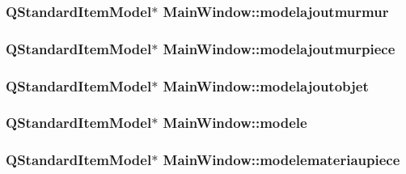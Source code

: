 \hypertarget{class_main_window_acd367909c8521374eb653c45461cc156}{
\subsubsection[{modelajoutmurmur}]{\setlength{\rightskip}{0pt plus 5cm}Q\+Standard\+Item\+Model$\ast$ Main\+Window\+::modelajoutmurmur\hspace{0.3cm}{\ttfamily [private]}}}\label{class_main_window_acd367909c8521374eb653c45461cc156}
\hypertarget{class_main_window_a9e0fb8f99860fbcbdb1058e3118ed73a}{
\subsubsection[{modelajoutmurpiece}]{\setlength{\rightskip}{0pt plus 5cm}Q\+Standard\+Item\+Model$\ast$ Main\+Window\+::modelajoutmurpiece\hspace{0.3cm}{\ttfamily [private]}}}\label{class_main_window_a9e0fb8f99860fbcbdb1058e3118ed73a}
\hypertarget{class_main_window_abaf343df783ca19135463902b101a832}{
\subsubsection[{modelajoutobjet}]{\setlength{\rightskip}{0pt plus 5cm}Q\+Standard\+Item\+Model$\ast$ Main\+Window\+::modelajoutobjet\hspace{0.3cm}{\ttfamily [private]}}}\label{class_main_window_abaf343df783ca19135463902b101a832}
\hypertarget{class_main_window_abb752b382e336483740c8e0ad21cbcf5}{
\subsubsection[{modele}]{\setlength{\rightskip}{0pt plus 5cm}Q\+Standard\+Item\+Model$\ast$ Main\+Window\+::modele\hspace{0.3cm}{\ttfamily [private]}}}\label{class_main_window_abb752b382e336483740c8e0ad21cbcf5}
\hypertarget{class_main_window_a7bdcda1e4a341f69651631c5ee882c41}{
\subsubsection[{modelemateriaupiece}]{\setlength{\rightskip}{0pt plus 5cm}Q\+Standard\+Item\+Model$\ast$ Main\+Window\+::modelemateriaupiece\hspace{0.3cm}{\ttfamily [private]}}}\label{class_main_window_a7bdcda1e4a341f69651631c5ee882c41}
